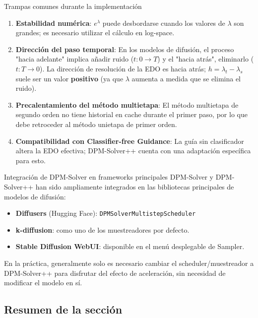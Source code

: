 \documentclass[a4paper]{article}
\begin{document}
\begin{warningbox}{Trampas comunes durante la implementación}
\begin{enumerate}
    \item \textbf{Estabilidad numérica}: $e^{\lambda}$ puede desbordarse cuando los valores de $\lambda$ son grandes; es necesario utilizar el cálculo en log-space.
    \item \textbf{Dirección del paso temporal}: En los modelos de difusión, el proceso "hacia adelante" implica añadir ruido ($t: 0 \to T$) y el "hacia atrás", eliminarlo ($t: T \to 0$). La dirección de resolución de la EDO es hacia atrás; $h = \lambda_t - \lambda_s$ suele ser un valor\textbf{ positivo} (ya que $\lambda$ aumenta a medida que se elimina el ruido).
    \item \textbf{Precalentamiento del método multietapa}: El método multietapa de segundo orden no tiene historial en cache durante el primer paso, por lo que debe retroceder al método unietapa de primer orden.
    \item \textbf{Compatibilidad con Classifier-free Guidance}: La guía sin clasificador altera la EDO efectiva; DPM-Solver++ cuenta con una adaptación específica para esto.
\end{enumerate}
\end{warningbox}

\begin{knowledgebox}{Integración de DPM-Solver en frameworks principales}
DPM-Solver y DPM-Solver++ han sido ampliamente integrados en las bibliotecas principales de modelos de difusión:
\begin{itemize}
    \item \textbf{Diffusers} (Hugging Face): \texttt{DPMSolverMultistepScheduler}
    \item \textbf{k-diffusion}: como uno de los muestreadores por defecto.
    \item \textbf{Stable Diffusion WebUI}: disponible en el menú desplegable de Sampler.
\end{itemize}
En la práctica, generalmente solo es necesario cambiar el scheduler/muestreador a DPM-Solver++ para disfrutar del efecto de aceleración, sin necesidad de modificar el modelo en sí.
\end{knowledgebox}

\subsection{Resumen de la sección}
\end{document}

